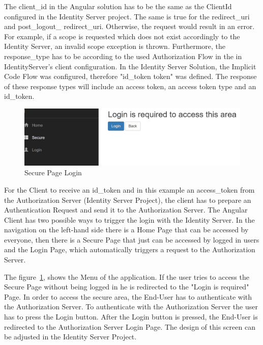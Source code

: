 The client\_id in the Angular solution has to be the same as the ClientId configured in the Identity Server project. The same is true for the redirect\_uri and post\_logout\_ redirect\_uri. Otherwise, the request would result in an error. For example, if a scope is requested which does not exist accordingly to the Identity Server, an invalid scope exception is thrown. Furthermore, the response\_type has to be according to the used Authorization Flow in the in IdentityServer's client configuration. In the Identity Server Solution, the  Implicit Code Flow was configured, therefore "id\_token token" was defined. The response of these response types will include an access token, an access token type and an id\_token.  

\begin{figure}[h]
	\centering
	\includegraphics[width=0.8\linewidth]{images/secure_page_requires_login}
	\caption{Secure Page Login}
	\label{fig:securepagerequireslogin}
\end{figure}

For the Client to receive an id\_token and in this example an access\_token from the Authorization Server (Identity Server Project), the client has to prepare an Authentication Request and send it to the Authorization Server. The Angular Client has two possible ways to trigger the login with the Identity Server. In the navigation on the left-hand side there is a Home Page that can be accessed by everyone, then there is a Secure Page that just can be accessed by logged in users and the Login Page, which automatically triggers a request to the Authorization Server.



The figure~\ref{fig:securepagerequireslogin}, shows the Menu of the application. If the user tries to access the Secure Page without being logged in he is redirected to the "Login is required" Page. In order to access the secure area, the End-User has to authenticate with the Authorization Server.
To authenticate with the Authorization Server the user has to press the Login button. After the Login button is pressed, the End-User is redirected to the Authorization Server Login Page. The design of this screen can be adjusted in the Identity Server Project. 

